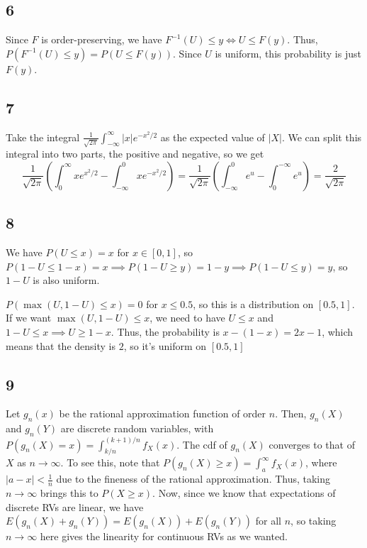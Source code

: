 \documentclass{article}
\begin{document}
\subsection*{6}
Since $F$ is order-preserving, we have $F^{-1}(U)\leq y\Longleftrightarrow U\leq F(y)$. Thus, $P(F^{-1}(U)\leq y)=P(U\leq F(y))$. Since $U$ is uniform, this probability is just $F(y)$.
\subsection*{7}
Take the integral $\frac{1}{\sqrt{2\pi}}\int_{-\infty}^\infty|x|e^{-x^2/2}$ as the expected value of $|X|$. We can split this integral into two parts, the positive and negative, so we get
$$\frac{1}{\sqrt{2\pi}}\left(\int_0^\infty xe^{x^2/2}-\int_{-\infty}^0xe^{-x^2/2}\right)=\frac{1}{\sqrt{2\pi}}\left(\int_{-\infty}^0e^u-\int_0^{-\infty}e^u\right)=\frac{2}{\sqrt{2\pi}}$$
\subsection*{8}
We have $P(U\leq x)=x$ for $x\in[0,1]$, so $P(1-U\leq 1-x)=x\implies P(1-U\geq y)=1-y\implies P(1-U\leq y)=y$, so $1-U$ is also uniform.

$P(\max(U,1-U)\leq x)=0$ for $x\leq0.5$, so this is a distribution on $[0.5,1]$. If we want $\max(U,1-U)\leq x$, we need to have $U\leq x$ and $1-U\leq x\implies U\geq 1-x$. Thus, the probability is $x-(1-x)=2x-1$, which means that the density is $2$, so it's uniform on $[0.5,1]$
\subsection*{9}
Let $g_n(x)$ be the rational approximation function of order $n$. Then, $g_n(X)$ and $g_n(Y)$ are discrete random variables, with $P(g_n(X)=x)=\int_{k/n}^{(k+1)/n}f_X(x)$. The cdf of $g_n(X)$ converges to that of $X$ as $n\to\infty$. To see this, note that $P(g_n(X)\geq x)=\int_a^\infty f_X(x)$, where $|a-x|<\frac{1}{n}$ due to the fineness of the rational approximation. Thus, taking $n\to\infty$ brings this to $P(X\geq x)$. Now, since we know that expectations of discrete RVs are linear, we have $E(g_n(X)+g_n(Y))=E(g_n(X))+E(g_n(Y))$ for all $n$, so taking $n\to\infty$ here gives the linearity for continuous RVs as we wanted.
\end{document}
